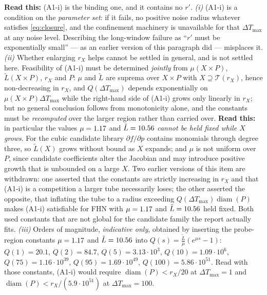 \documentclass[11pt]{article}
\theoremstyle{remark}\newtheorem{remark}{Remark}
\newcommand{\readthis}[1]{\textbf{Read this:} #1}
\begin{document}
\readthis{(A1-i) is the binding one, and it contains no $r'$.
\emph{(i)} (A1-i) is a condition on the \emph{parameter set}: if it fails, no positive noise radius whatever satisfies \eqref{eq:closure}, and the confinement machinery is unavailable for that $\Delta T_{\max}$ at any noise level. Describing the long-window failure as ``$r'$ must be exponentially small'' --- as an earlier version of this paragraph did --- misplaces it.
\emph{(ii)} Whether enlarging $r_X$ helps cannot be settled in general, and is not settled here. Feasibility of (A1-i) must be determined \emph{jointly} from $\mu(X\times P)$, $\tilde L(X\times P)$, $r_X$ and $P$: $\mu$ and $\tilde L$ are suprema over $X\times P$ with $X\supseteq\mathcal T(r_X)$, hence non-decreasing in $r_X$, and $Q(\Delta T_{\max})$ depends exponentially on $\mu(X\times P)\Delta T_{\max}$ while the right-hand side of (A1-i) grows only linearly in $r_X$; but no general conclusion follows from monotonicity alone, and the constants must be \emph{recomputed} over the larger region rather than carried over. \readthis{in particular the values $\mu=1.17$ and $\tilde L=10.56$ \emph{cannot be held fixed while $X$ grows}. For the cubic candidate library $\partial f/\partial p$ contains monomials through degree three, so $\tilde L(X)$ grows without bound as $X$ expands; and $\mu$ is not uniform over $P$, since candidate coefficients alter the Jacobian and may introduce positive growth that is unbounded on a large $X$. Two earlier versions of this item are withdrawn: one asserted that the constants are strictly increasing in $r_X$ and that (A1-i) is a competition a larger tube necessarily loses; the other asserted the opposite, that inflating the tube to a radius exceeding $Q(\Delta T_{\max})\operatorname{diam}(P)$ makes (A1-i) satisfiable for FHN with $\mu=1.17$ and $\tilde L=10.56$ held fixed. Both used constants that are not global for the candidate family the report actually fits.}
\emph{(iii)} Orders of magnitude, \emph{indicative only}, obtained by inserting the probe-region constants $\mu=1.17$ and $\tilde L=10.56$ into $Q(s)=\frac{\tilde L}{\mu}(e^{\mu s}-1)$: $Q(1)=20.1$, $Q(2)=84.7$, $Q(5)=3.13\cdot10^{3}$, $Q(10)=1.09\cdot10^{6}$, $Q(75)=1.16\cdot10^{39}$, $Q(95)=1.69\cdot10^{49}$, $Q(100)=5.86\cdot10^{51}$. Read with those constants, (A1-i) would require $\operatorname{diam}(P)<r_X/20$ at $\Delta T_{\max}=1$ and $\operatorname{diam}(P)<r_X/(5.9\cdot10^{51})$ at $\Delta T_{\max}=100$.
}
\end{document}
